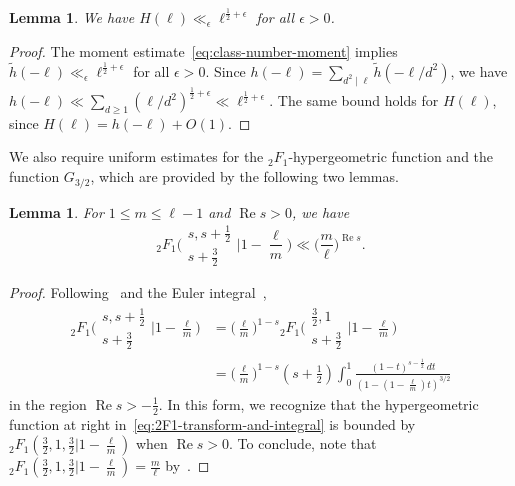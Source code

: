 \documentclass[11pt,reqno]{amsart}
\theoremstyle{plain}
\newtheorem{lemma}[theorem]{Lemma}
\theoremstyle{definition}
\numberwithin{equation}{section}
\renewcommand{\Re}{\operatorname{Re}}
\begin{document}
\begin{lemma} \label{lem:H-growth}
We have $H(\ell) \ll_\epsilon \ell^{\frac{1}{2} + \epsilon}$ for all $\epsilon > 0$.
\end{lemma}

\begin{proof} The moment estimate~\eqref{eq:class-number-moment} implies $\widetilde{h}(-\ell) \ll_\epsilon \ell^{\frac{1}{2} + \epsilon}$ for all $\epsilon > 0$. Since $h(-\ell) = \sum_{d^2 \mid \ell} \widetilde{h}(-\ell/d^2)$, we have $h(-\ell) \ll \sum_{d \geq 1} (\ell/d^2)^{\frac{1}{2}+\epsilon} \ll \ell^{\frac{1}{2}+\epsilon}$. The same bound holds for $H(\ell)$, since $H(\ell ) = h(-\ell) + O(1)$.
\end{proof}

We also require uniform estimates for the ${}_2F_1$-hypergeometric function and the function $G_{3/2}$, which are provided by the following two lemmas. 

\begin{lemma} \label{lem:hypergeometric-growth}
For $1 \leq m \leq \ell-1$ and $\Re s > 0$, we have
\[
{}_2F_1\Big(\begin{matrix} s, s+\frac{1}{2} \\ s+\frac{3}{2} \end{matrix}\Big\vert 1-\frac{\ell}{m} \Big)
	\ll \Big(\frac{m}{\ell}\Big)^{\Re s}.
\]
\end{lemma}

\begin{proof}
Following~\cite[9.131(1)]{GradshteynRyzhik07} and the Euler integral~\cite[9.111]{GradshteynRyzhik07},
\begin{align} \label{eq:2F1-transform-and-integral}
	{}_2F_1\Big(\begin{matrix} s, s+\frac{1}{2} \\ s+\frac{3}{2} \end{matrix}
					\Big\vert 1-\frac{\ell}{m} \Big)
		&= \Big(\frac{\ell}{m}\Big)^{1-s}
		{}_2F_1\Big(\begin{matrix} \frac{3}{2}, 1 \\ s+\frac{3}{2} \end{matrix}
					\Big\vert 1-\frac{\ell}{m} \Big) \\
	&=  \Big(\frac{\ell}{m}\Big)^{1-s} (s+\tfrac{1}{2})
		\int_0^1 \frac{(1-t)^{s-\frac{1}{2}} \, dt}{(1-(1-\frac{\ell}{m}) t)^{3/2}}
\end{align}
in the region $\Re s > -\frac{1}{2}$. In this form, we recognize that the hypergeometric function at right in~\eqref{eq:2F1-transform-and-integral} is bounded by ${}_2F_1(\frac{3}{2},1,\frac{3}{2} \vert 1 - \frac{\ell}{m})$ when $\Re s > 0$. To conclude, note that ${}_2F_1(\frac{3}{2},1,\frac{3}{2} \vert 1 - \frac{\ell}{m}) = \frac{m}{\ell}$ by~\cite[(9.121)]{GradshteynRyzhik07}.
\end{proof}
\end{document}
